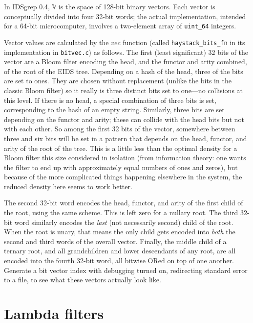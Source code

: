 \documentclass[twocolumn]{report}
\newcommand{\DangerousSection}{\marginpar{\large\hfill
\raisebox{-0.5\baselineskip}[0pt][0pt]{\dbend}\hfill\null}}
\begin{document}
In IDSgrep 0.4, $\mathbb{V}$ is the space of 128-bit binary vectors.  Each
vector is conceptually divided into four 32-bit words; the actual
implementation, intended for a 64-bit microcomputer, involves a two-element
array of \texttt{uint\_64} integers.

Vector values are calculated by the $\mathit{vec}$ function (called
\texttt{haystack\_bits\_fn} in its implementation in \texttt{bitvec.c}) as
follows.  The first (least significant) 32 bits of the vector are a Bloom
filter encoding the head, and the functor and arity combined, of the root of
the EIDS tree.  Depending on a hash of the head, three of the bits are set
to ones.  They are chosen without replacement (unlike the bits in the
classic Bloom filter) so it really is three distinct bits set to one---no
collisions at this level.  If there is no head, a special combination of
three bits is set, corresponding to the hash of an empty string.  Similarly,
three bits are set depending on the functor and arity; these can collide
with the head bits but not with each other.  So among the first 32 bits of
the vector, somewhere between three and six bits will be set in a pattern
that depends on the head, functor, and arity of the root of the tree.  This
is a little less than the optimal density for a Bloom filter this size
considered in isolation (from information theory: one wants the filter to
end up with approximately equal numbers of ones and zeros), but because of
the more complicated things happening elsewhere in the system, the reduced
density here seems to work better.

The second 32-bit word encodes the head, functor, and arity of the first
child of the root, using the same scheme.  This is left zero for a nullary
root.  The third 32-bit word similarly encodes the \emph{last} (not
necessarily second) child of the root.  When the root is unary, that means
the only child gets encoded into \emph{both} the second and third words of
the overall vector.  Finally, the middle child of a ternary root, and all
grandchildren and lower descendants of any root, are all encoded into the
fourth 32-bit word, all bitwise ORed on top of one another.  Generate a bit
vector index with debugging turned on, redirecting standard error to a file,
to see what these vectors actually look like.


\section{Lambda filters}\DangerousSection
\end{document}
